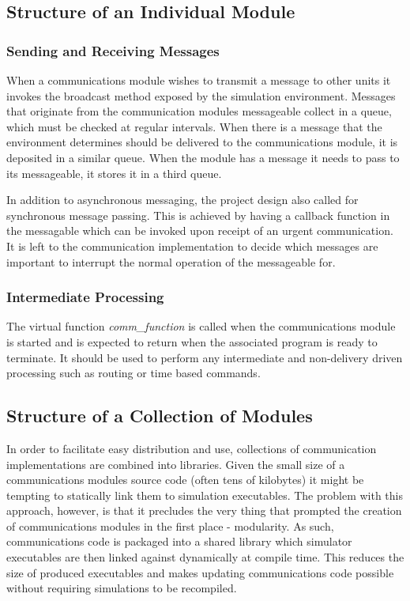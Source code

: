 \subsection{Structure of an Individual Module}
\subsubsection{Sending and Receiving Messages}
		
When a communications module wishes to transmit a message to other units it invokes the broadcast method exposed by the simulation environment. Messages that originate from the communication modules messageable collect in a queue, which must be checked at regular intervals. When there is a message that the environment determines should be delivered to the communications module, it is deposited in a similar queue. When the module has a message it needs to pass to its messageable, it stores it in a third queue.

In addition to asynchronous messaging, the project design also called for synchronous message passing. This is achieved by having a callback function in the messagable which can be invoked upon receipt of an urgent communication. It is left to the communication implementation to decide which messages are important to interrupt the normal operation of the messageable for.
		
\subsubsection{Intermediate Processing}
The virtual function \textit{comm\_function} is called when the communications module is started and is expected to return when the associated program is ready to terminate. It should be used to perform any intermediate and non-delivery driven processing such as routing or time based commands.
		
\subsection{Structure of a Collection of Modules}
	
In order to facilitate easy distribution and use, collections of communication implementations are combined into libraries. Given the small size of a communications modules source code (often tens of kilobytes) it might be tempting to statically link them to simulation executables. The problem with this approach, however, is that it precludes the very thing that prompted the creation of communications modules in the first place - modularity. As such, communications code is packaged into a shared library which simulator executables are then linked against dynamically at compile time. This reduces the size of produced executables and makes updating communications code possible without requiring simulations to be recompiled.

